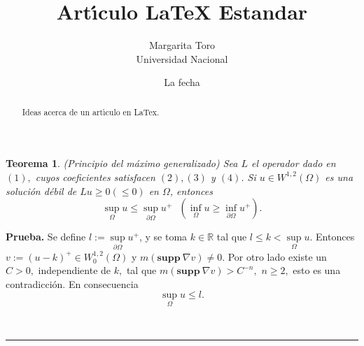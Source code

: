 \documentclass{article}%
\newtheorem{theorem}{Teorema}
\newenvironment{proof}[1][Prueba]{\textbf{#1.} }{\ \rule{0.5em}{0.5em}}
\begin{document}
\title{Art\'{\i}culo LaTeX Estandar}
\author{Margarita Toro\\Universidad Nacional}
\date{La fecha}
\maketitle

\begin{abstract}
Ideas acerca de un art\'{\i}culo en LaTex.

\end{abstract}



\begin{theorem}
(Principio del m\'{a}ximo generalizado) Sea $L$ el operador dado en $(1),$
cuyos coeficientes satisfacen $\left(  2\right)  ,\left(  3\right)  $ y
$\left(  4\right)  $. Si $u\in W^{1,2}\left(  \Omega\right)  $ es una
soluci\'{o}n d\'{e}bil de $Lu\geq0\left(  \leq0\right)  $ en $\Omega$,
entonces
\[
\sup_{\Omega}u\leq\sup_{\partial\Omega}u^{+}\text{ \ }\left(  \inf_{\Omega
}u\geq\inf_{\partial\Omega}u^{+}\right)  .
\]

\end{theorem}

\begin{proof}
Se define $l:=\sup\limits_{\partial\Omega}u^{+}$, y se toma $k\in\mathbb{R}$
tal que $l\leq k<\sup\limits_{\Omega}u$. Entonces $v:=\left(  u-k\right)
^{+}\in W_{0}^{1,2}\left(  \Omega\right)  $ y $m(\mathbf{supp\ }\nabla
v)\neq0.$ Por otro lado existe un $C>0,$ independiente de $k,$ tal que
$m(\mathbf{supp\ }\nabla v)>C^{-n},$ $n\geq2,$ esto es una contradicci\'{o}n.
En consecuencia
\[
\sup_{\Omega}u\leq l\text{.}%
\]

\end{proof}
\end{document}
